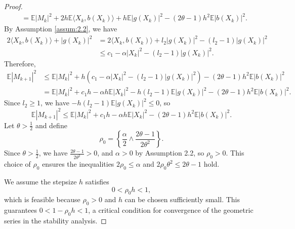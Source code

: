\documentclass[10pt,a4paper]{amsart}
\begin{document}
\begin{proof}
\[\begin{aligned}
	&= \mathbb{E}|M_k|^2 + 2h \mathbb{E}\langle X_k, b(X_k) \rangle + h \mathbb{E}|g(X_k)|^2 - (2\theta - 1)h^2 \mathbb{E}|b(X_k)|^2.
\end{aligned}
\]  
By Assumption \ref{assum:2.2}, we have  
\[
\begin{aligned}
	2\langle X_k, b(X_k) \rangle + |g(X_k)|^2 &= 2\langle X_k, b(X_k) \rangle + l_2 |g(X_k)|^2 - (l_2 - 1)|g(X_k)|^2 \\
	&\leq c_1 - \alpha |X_k|^2 - (l_2 - 1)|g(X_k)|^2.
\end{aligned}
\]  
Therefore,  
\[
\begin{aligned}
	\mathbb{E}|M_{k+1}|^2 &\leq \mathbb{E}|M_k|^2 + h\left(c_1 - \alpha |X_k|^2 - (l_2 - 1)|g(X_k)|^2\right) - (2\theta - 1)h^2 \mathbb{E}|b(X_k)|^2 \\
	&= \mathbb{E}|M_k|^2 + c_1 h - \alpha h \mathbb{E}|X_k|^2 - h(l_2 - 1)\mathbb{E}|g(X_k)|^2 - (2\theta - 1)h^2 \mathbb{E}|b(X_k)|^2.
\end{aligned}
\]  
Since $ l_2 \geq 1 $, we have $ -h(l_2 - 1)\mathbb{E}|g(X_k)|^2 \leq 0 $, so  
\[
\mathbb{E}|M_{k+1}|^2 \leq \mathbb{E}|M_k|^2 + c_1 h - \alpha h \mathbb{E}|X_k|^2 - (2\theta - 1)h^2 \mathbb{E}|b(X_k)|^2.
\]  
Let $\theta > \frac{1}{2}$ and define  
\[
\rho_0 = \left\{\dfrac{\alpha}{2} \wedge \dfrac{2\theta - 1}{2\theta^2}\right\}.
\]  
Since $\theta > \frac{1}{2}$, we have $\frac{2\theta - 1}{2\theta^2} > 0$, and $\alpha > 0$ by Assumption 2.2, so $\rho_0 > 0$. This choice of $\rho_0$ ensures the inequalities $2\rho_0 \leq \alpha$ and $2\rho_0\theta^2 \leq 2\theta - 1$ hold.


We assume the stepsize $h$ satisfies  
\[
0 < \rho_0 h < 1,
\]  
which is feasible because $\rho_0 > 0$ and $h$ can be chosen sufficiently small. This guarantees $0 < 1 - \rho_0 h < 1$, a critical condition for convergence of the geometric series in the stability analysis.


\end{proof}
\end{document}
